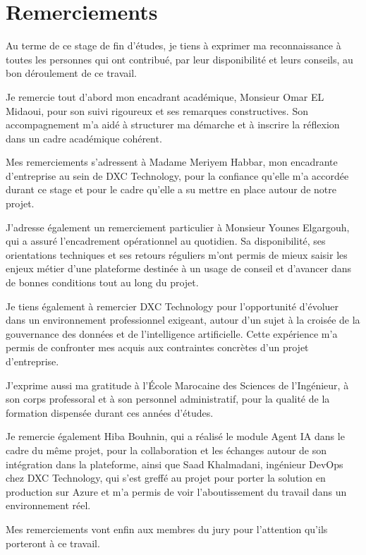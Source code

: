 \documentclass[12pt,a4paper]{report}
\begin{document}
\chapter*{Remerciements}
Au terme de ce stage de fin d'études, je tiens à exprimer ma reconnaissance à toutes les personnes qui ont contribué, par leur disponibilité et leurs conseils, au bon déroulement de ce travail.

Je remercie tout d'abord mon encadrant académique, Monsieur Omar EL Midaoui, pour son suivi rigoureux et ses remarques constructives. Son accompagnement m'a aidé à structurer ma démarche et à inscrire la réflexion dans un cadre académique cohérent.

Mes remerciements s'adressent à Madame Meriyem Habbar, mon encadrante d'entreprise au sein de DXC Technology, pour la confiance qu'elle m'a accordée durant ce stage et pour le cadre qu'elle a su mettre en place autour de notre projet.

J'adresse également un remerciement particulier à Monsieur Younes Elgargouh, qui a assuré l'encadrement opérationnel au quotidien. Sa disponibilité, ses orientations techniques et ses retours réguliers m'ont permis de mieux saisir les enjeux métier d'une plateforme destinée à un usage de conseil et d'avancer dans de bonnes conditions tout au long du projet.

Je tiens également à remercier DXC Technology pour l'opportunité d'évoluer dans un environnement professionnel exigeant, autour d'un sujet à la croisée de la gouvernance des données et de l'intelligence artificielle. Cette expérience m'a permis de confronter mes acquis aux contraintes concrètes d'un projet d'entreprise.

J'exprime aussi ma gratitude à l'École Marocaine des Sciences de l'Ingénieur, à son corps professoral et à son personnel administratif, pour la qualité de la formation dispensée durant ces années d'études.

Je remercie également Hiba Bouhnin, qui a réalisé le module Agent IA dans le cadre du même projet, pour la collaboration et les échanges autour de son intégration dans la plateforme, ainsi que Saad Khalmadani, ingénieur DevOps chez DXC Technology, qui s'est greffé au projet pour porter la solution en production sur Azure et m'a permis de voir l'aboutissement du travail dans un environnement réel.

Mes remerciements vont enfin aux membres du jury pour l'attention qu'ils porteront à ce travail.
\end{document}
